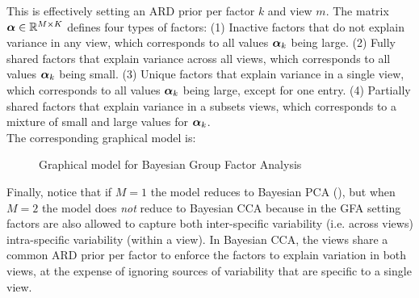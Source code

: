 This is effectively setting an ARD prior per factor $k$ and view $m$. The matrix $\mbox{\boldmath $\alpha$} \in \mathbb{R}^{M \times K}$ defines four types of factors: (1) Inactive factors that do not explain variance in any view, which corresponds to all values $\mbox{\boldmath $\alpha$}_k$ being large. (2) Fully shared factors that explain variance across all views, which corresponds to all values $\mbox{\boldmath $\alpha$}_k$ being small. (3) Unique factors that explain variance in a single view, which corresponds to all values $\mbox{\boldmath $\alpha$}_k$ being large, except for one entry. (4) Partially shared factors that explain variance in a subsets views, which corresponds to a mixture of small and large values for $\mbox{\boldmath $\alpha$}_k$.\\

The corresponding graphical model is:

\begin{figure}[H] \begin{center}
	
	\label{fig:graphical_GFA}
	\caption{Graphical model for Bayesian Group Factor Analysis}
\end{center} \end{figure}



Finally, notice that if $M=1$ the model reduces to Bayesian PCA (), but when $M=2$ the model does \textit{not} reduce to Bayesian CCA because in the GFA setting factors are also allowed to capture both inter-specific variability (i.e. across views) intra-specific variability (within a view). In Bayesian CCA, the views share a common ARD prior per factor to enforce the factors to explain variation in both views, at the expense of ignoring sources of variability that are specific to a single view.

